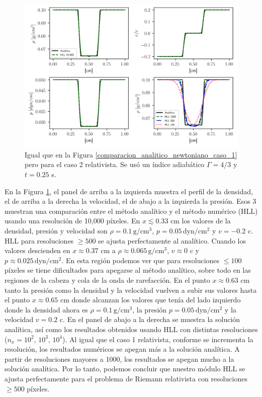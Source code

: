 \documentclass[12pt,a4paper]{book}
\begin{document}
\begin{figure}
  \centering
    \includegraphics[width=1.0\textwidth]{./Figuras/capitulo_3/caso_relativista/caso_rel_rar_rar.png}
  \caption{Igual que en la Figura \ref{comparacion_analitico_newtoniano_caso_1} pero para el caso 2 
  relativista. Se usó un índice adiabático $\Gamma = 4/3$ y $t = 0.25$ s.
  } \label{caso_rel_shock_shock_2}
\end{figure}

En la Figura \ref{caso_rel_shock_shock_2}, el panel de arriba a la izquierda muestra el perfil de la 
densidad, el de arriba a la derecha la velocidad, el de abajo a la izquierda la presión. Esos 3 muestran
una comparación entre el método analítico y el método numérico (HLL) usando una resolución de 
10,000 píxeles. 
En $x \lesssim 0.33$ cm los valores de la densidad, presión y velocidad son 
$\rho = 0.1 \,  \text{g}/ \text{cm}^3$, $p = 0.05 \,  \text{dyn}/ \text{cm}^2 $
y $v = -0.2$ c. HLL para resoluciones $\geq 500$ se ajusta perfectamente al analítico. Cuando los 
valores descienden en $x \approx 0.37$ cm a $\rho \approx 0.065 \,  \text{g}/ \text{cm}^3$, 
$v \approx 0$ c y $p \approx 0.025\,  \text{dyn}/ \text{cm}^2 $. En
esta región podemos ver que para resoluciones $\leq 100$ píxeles se tiene dificultades para apegarse al
método analítico, sobre todo en las regiones de la cabeza y cola de la onda de rarefacción. En el punto $x \approx 0.63$  cm tanto la presión como la densidad y la velocidad vuelven a subir
sus valores hasta el punto $x \approx 0.65$ cm donde alcanzan los valores que tenía del lado izquierdo
donde la densidad ahora es $\rho = 0.1 \,  \text{g}/ \text{cm}^3$, la presión $p = 0.05 \,  \text{dyn}/ \text{cm}^2 $ 
y la velocidad $v = 0.2$ c.
En el panel de abajo a la derecha se muestra la solución analítica, así como los resultados obtenidos 
usando HLL con distintas resoluciones ($n_x = 10^2, \, 10^3, \,10^4$). 
Al igual que el caso 1 relativista,
conforme se incrementa la resolución, los resultados numéricos se apegan más a la solución analítica.
A partir de resoluciones mayores a 1000, los resultados se apegan mucho a la solución analítica.
Por lo tanto, podemos concluir que nuestro módulo HLL se ajusta perfectamente para el problema de 
Riemann relativista con resoluciones $\geq 500$ píxeles.
\end{document}
